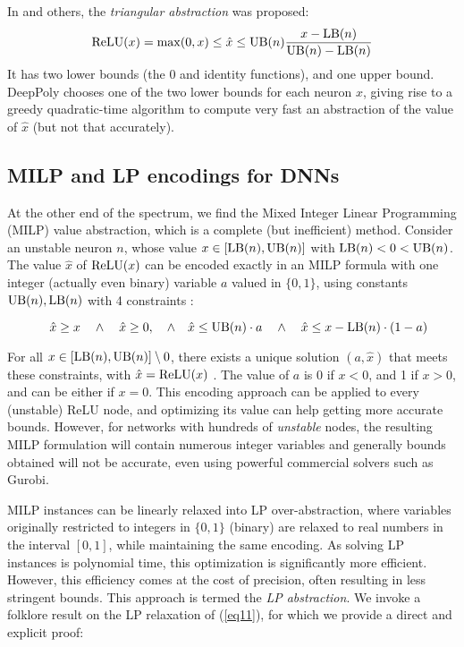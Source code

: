 In \cite{DBLP_Ehlers17,deeppoly} and others, the {\em triangular abstraction} was proposed:
\begin{align}
	\mathrm{ReLU}(x) = \max (0,x) \leq \hat{x} \leq \mathrm{UB}(n) \frac{x-\mathrm{LB}(n)}{\mathrm{UB}(n)-\mathrm{LB}(n)} 
	\label{eq:deeppoly}
\end{align} 
It has two lower bounds (the 0 and identity functions), and one upper bound. 
DeepPoly \cite{deeppoly} chooses one of the two lower bounds for each neuron $x$, giving rise to a greedy quadratic-time algorithm to compute very fast an abstraction of the value of $\hat{x}$ (but not that accurately).




\subsection{MILP and LP encodings for DNNs}

At the other end of the spectrum, we find the Mixed Integer Linear Programming (MILP) value abstraction, which is a complete (but inefficient) method. 
Consider an unstable neuron $n$, whose value $x \in [\mathrm{LB}(n),\mathrm{UB}(n)]$ with $\mathrm{LB}(n)<0<\mathrm{UB}(n)$.
The value $\hat{x}$ of $\mathrm{ReLU}(x)$ can be encoded exactly in an MILP formula with one 
integer (actually even binary) variable $a$ valued in $\{0,1\}$, using constants $\mathrm{UB}(n),\mathrm{LB}(n)$ with 4 constraints \cite{MILP}:

\vspace{-0.4cm}
\begin{equation}\quad \hat{x} \geq x \quad \wedge \quad \hat{x} \geq 0, \quad \wedge \quad \hat{x} \leq \mathrm{UB}(n) \cdot a \quad \wedge \quad \hat{x} \leq x-\mathrm{LB}(n) \cdot (1-a)
\label{eq11}
\end{equation}

For all $x \in [\mathrm{LB}(n),\mathrm{UB}(n)] \setminus 0$, there exists a unique solution $(a,\hat{x})$ that meets these constraints, with $\hat{x}=\mathrm{ReLU}(x)$ \cite{MILP}. The value of $a$ is 0 if $x < 0$, and 1 if $x>0$, and can be either if $x=0$. This encoding approach can be applied to every (unstable) ReLU node, and optimizing its value can help getting more accurate bounds. However, for networks with hundreds of {\em unstable} nodes, the resulting MILP formulation will contain numerous integer variables and generally bounds obtained will not be accurate, even using powerful commercial solvers such as Gurobi.

MILP instances can be linearly relaxed into LP over-abstraction, where variables originally restricted to integers in $\{0,1\}$ (binary) are relaxed to real numbers in the interval $[0,1]$, while maintaining the same encoding. As solving LP instances is polynomial time, this optimization is significantly more efficient. However, this efficiency comes at the cost of precision, often resulting in less stringent bounds. This approach is termed the {\em LP abstraction}. We invoke a folklore result on the LP relaxation of (\ref{eq11}), for which we provide a direct and explicit proof:

